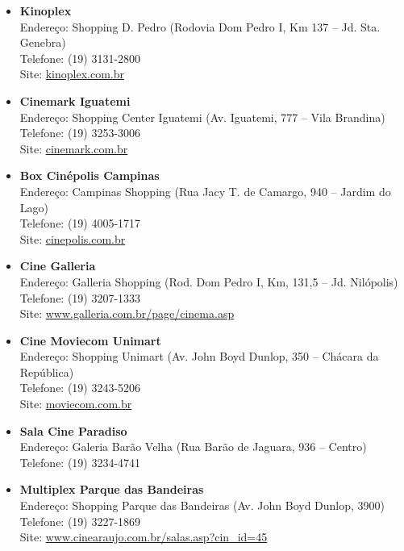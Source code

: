 \begin{itemize}
\item   \textbf{Kinoplex}
		\\Endereço: Shopping D. Pedro (Rodovia Dom Pedro I, Km 137 -- Jd. Sta. Genebra)
		\\Telefone: (19) 3131-2800
		\\Site: \url{kinoplex.com.br}

\item   \textbf{Cinemark Iguatemi}
		\\Endereço: Shopping Center Iguatemi (Av. Iguatemi, 777 -- Vila Brandina)
		\\Telefone: (19) 3253-3006
		\\Site: \url{cinemark.com.br}

\item   \textbf{Box Cinépolis Campinas}
		\\Endereço: Campinas Shopping (Rua Jacy T. de Camargo, 940 -- Jardim do Lago)
		\\Telefone: (19) 4005-1717
		\\Site: \url{cinepolis.com.br}

\item   \textbf{Cine Galleria}
		\\Endereço: Galleria Shopping (Rod. Dom Pedro I, Km, 131,5 -- Jd. Nilópolis)
		\\Telefone: (19) 3207-1333
		\\Site: \url{www.galleria.com.br/page/cinema.asp}

\item   \textbf{Cine Moviecom Unimart}
		\\Endereço: Shopping Unimart (Av. John Boyd Dunlop, 350 -- Chácara da República)
		\\Telefone: (19) 3243-5206
		\\Site: \url{moviecom.com.br}

\item   \textbf{Sala Cine Paradiso}
		\\Endereço: Galeria Barão Velha (Rua Barão de Jaguara, 936 -- Centro)
		\\Telefone: (19) 3234-4741

\item   \textbf{Multiplex Parque das Bandeiras}
		\\Endereço: Shopping Parque das Bandeiras (Av. John Boyd Dunlop, 3900)
		\\Telefone: (19) 3227-1869
		\\Site: \url{www.cinearaujo.com.br/salas.asp?cin_id=45}


\end{itemize}
